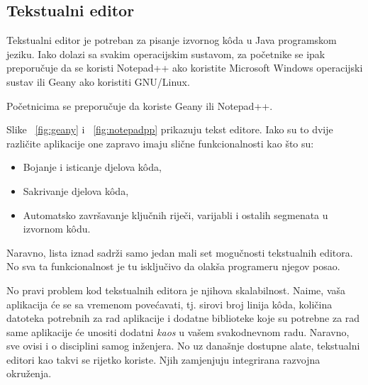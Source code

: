 \subsection{Tekstualni editor}
Tekstualni editor je potreban za pisanje izvornog kôda u Java programskom jeziku. Iako dolazi sa svakim operacijskim sustavom, za početnike se ipak preporučuje da se koristi Notepad++ ako koristite Microsoft Windows operacijski sustav ili Geany ako koristiti GNU/Linux.

\begin{infobox}
    Početnicima se preporučuje da koriste Geany ili Notepad++.
\end{infobox}

Slike ~\ref{fig:geany} i ~\ref{fig:notepadpp} prikazuju tekst editore. Iako su to dvije različite aplikacije one zapravo imaju slične funkcionalnosti kao što su:

\begin{itemize}
    \item Bojanje i isticanje djelova kôda,
    \item Sakrivanje djelova kôda,
    \item Automatsko završavanje ključnih riječi, varijabli i ostalih segmenata u izvornom kôdu.
\end{itemize}

Naravno, lista iznad sadrži samo jedan mali set mogučnosti tekstualnih editora. No sva ta funkcionalnost je tu isključivo da olakša programeru njegov posao.

No pravi problem kod tekstualnih editora je njihova skalabilnost. Naime, vaša aplikacija će se sa vremenom povećavati, tj. sirovi broj linija kôda, količina datoteka potrebnih za rad aplikacije i dodatne biblioteke koje su potrebne za rad same aplikacije će unositi dodatni \emph{kaos} u vašem svakodnevnom radu. Naravno, sve ovisi i o disciplini samog inženjera. No uz današnje dostupne alate, tekstualni editori kao takvi se rijetko koriste. Njih zamjenjuju integrirana razvojna okruženja.

